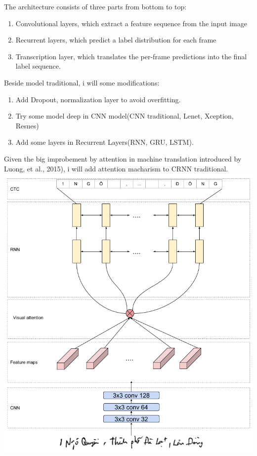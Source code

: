 \documentclass[14pt]{extarticle}
\newcommand{\<}{\langle}
\renewcommand{\>}{\rangle}
\theoremstyle{definition}
\begin{document}
The architecture consists of three parts from bottom to top: 
\begin{enumerate}
    \item Convolutional layers, which extract a feature sequence from the input image 
    \item Recurrent layers, which predict a label distribution for each frame 
    \item Transcription layer, which translates the per-frame predictions into the final label sequence.\cite{ctc}
\end{enumerate}
Beside model traditional, i will some modifications: 
\begin{enumerate}
    \item Add Dropout, normalization layer to avoid overfitting.
    \item Try some model deep in CNN model(CNN traditional, Lenet, Xception, Resnes)
    \item Add some layers in Recurrent Layers(RNN, GRU, LSTM).
\end{enumerate}
Given the big improbement by attention in machine translation introduced by Luong, et al., 2015)\cite{attention}, i will add attention macharism to CRNN traditional. 
\includegraphics[width=170mm,scale=0.7]{ocr_crnn.png}
\end{document}
